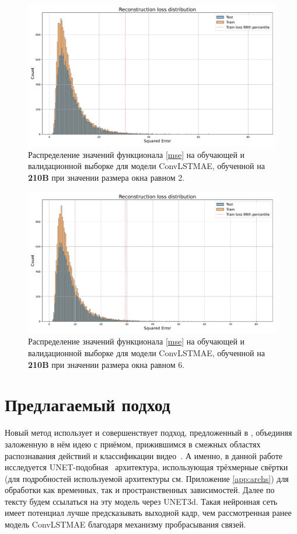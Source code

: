 \documentclass{article}
\begin{document}
    \begin{figure}[]
        \centering
            \includegraphics[scale=.3]{model_2_loss_distr.pdf}
            \caption{Распределение значений функционала \eqref{mse} на обучающей и валидационной выборке для модели ConvLSTMAE, обученной на \textbf{210B} при значении размера окна равном 2.}\label{model_2_loss_distr}
        \centering
    \end{figure}
    
    \begin{figure}[]
        \centering
            \includegraphics[scale=.3]{model_6_loss_distr.pdf}
            \caption{Распределение значений функционала \eqref{mse} на обучающей и валидационной выборке для модели ConvLSTMAE, обученной на \textbf{210B} при значении размера окна равном 6.}\label{model_6_loss_distr}
        \end{figure}

\section{Предлагаемый подход}\label{unet_intro}
    Новый метод использует и совершенствует подход, предложенный в \cite{conv_autoencoder}, объединяя заложенную в нём идею с приёмом, прижившимся в смежных областях распознавания действий и классификации видео~\cite{resnet3d, 3dconvs}. А именно, в данной работе исследуется UNET-подобная~\cite{UNET} архитектура, использующая трёхмерные свёртки (для подробностей используемой архитектуры см. Приложение \ref{app:archs}) для обработки как временных, так и пространственных зависимостей. Далее по тексту будем ссылаться на эту модель через UNET3d. Такая нейронная сеть имеет потенциал лучше предсказывать выходной кадр, чем рассмотренная ранее модель ConvLSTMAE благодаря механизму пробрасывания связей.
\end{document}
